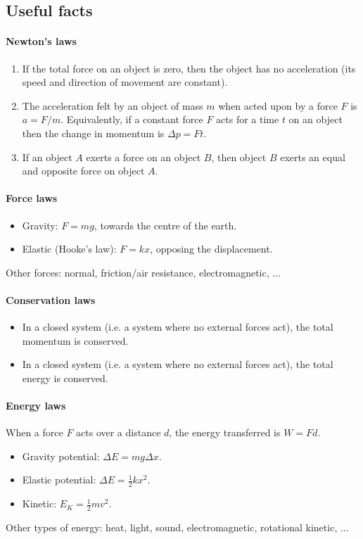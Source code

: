 \documentclass[answers]{exam}
\begin{document}
\clearpage
\subsection*{Useful facts}
\paragraph{Newton's laws}
\begin{enumerate}
  \item If the total force on an object is zero, then the object has no acceleration (its speed and direction of movement are constant).
  \item The acceleration felt by an object of mass $ m $ when acted upon by a force $ F $ is $ a = F/m $. Equivalently,
        if a constant force $ F $ acts for a time $ t $ on an object then the change in momentum is $ \Delta p = Ft $.
  \item If an object $ A $ exerts a force on an object $ B $, then object $ B $ exerts an equal and opposite force on object $ A $.
\end{enumerate}

\paragraph{Force laws}
\begin{itemize}
  \item Gravity: $ F = mg $, towards the centre of the earth.
  \item Elastic (Hooke's law): $ F = kx $, opposing the displacement.
\end{itemize}

Other forces: normal, friction/air resistance, electromagnetic, ...

\paragraph{Conservation laws}
\begin{itemize}
  \item In a closed system (i.e. a system where no external forces act), the total momentum is conserved.
  \item In a closed system (i.e. a system where no external forces act), the total energy is conserved.
\end{itemize}

\paragraph{Energy laws}
When a force $ F $ acts over a distance $ d $, the energy transferred is $ W = Fd $.

\begin{itemize}
  \item Gravity potential: $ \Delta E = mg \Delta x $.
  \item Elastic potential: $ \Delta E = \frac{1}{2} k x^2 $.
  \item Kinetic: $ E_K = \frac{1}{2} mv^2 $.
\end{itemize}

Other types of energy: heat, light, sound, electromagnetic, rotational kinetic, ...
\end{document}

